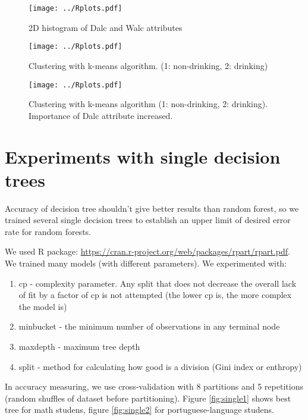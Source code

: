 \documentclass[a4paper]{article}
\begin{document}

\begin{figure}[H]
    \caption[]{2D histogram of Dalc and Walc attributes}
    \centering
    \texttt{[image: ../Rplots.pdf]}
    \label{fig:hist2D}
\end{figure}

\begin{figure}[H]
    \caption[]{Clustering with k-means algorithm. (1: non-drinking, 2: drinking)}
    \centering
    \texttt{[image: ../Rplots.pdf]}
    \label{fig:clust}
\end{figure}

\begin{figure}[H]
    \caption[]{Clustering with k-means algorithm (1: non-drinking, 2: drinking). Importance of Dalc attribute increased.}
    \centering
    \texttt{[image: ../Rplots.pdf]}
    \label{fig:clust2}
\end{figure}

\newpage
\section{Experiments with single decision trees}

Accuracy of decision tree shouldn't give better results than random forest,
so we trained several single decision trees to establish
an upper limit of desired error rate for random forests.

We used R package: \url{https://cran.r-project.org/web/packages/rpart/rpart.pdf}.
We trained many models (with different parameters).
We experimented with:
\begin{enumerate}
    \item cp - complexity parameter.
        Any split that does not decrease the overall lack of fit by a factor of cp is not attempted
        (the lower cp is, the more complex the model is)
    \item minbucket - the minimum number of observations in any terminal node
    \item maxdepth - maximum tree depth
    \item split - method for calculating how good is a division (Gini index or enthropy)
\end{enumerate}
In accuracy measuring, we use cross-validation with 8 partitions
and 5 repetitions (random shuffles of dataset before partitioning).
Figure \ref{fig:single1} shows best tree for math studens,
figure \ref{fig:single2} for portuguese-language studens.
\end{document}
